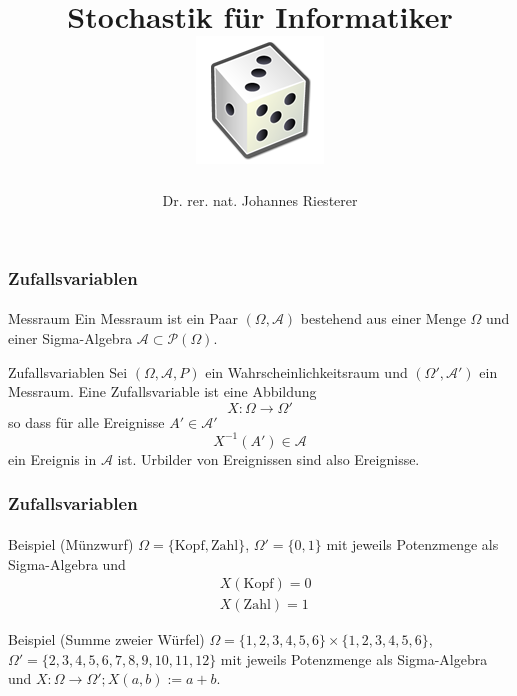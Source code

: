 \documentclass{beamer}
\begin{document}
\title[Stochastik] %
{Stochastik für Informatiker
\\
\includegraphics[scale=0.5]{img/craps}
}
\subtitle{}
\author[Dr. Johannes Riesterer] %
{Dr.  rer. nat. Johannes Riesterer}

\date[KPT 2004] %
{}

\subject{Stochastik}


\frame{\titlepage}


\begin{frame}
    \frametitle{Zufallsvariablen}
\framesubtitle{}

\begin{block}{Messraum}
Ein Messraum ist ein Paar $(\Omega, \mathcal{A})$ bestehend aus einer Menge $\Omega$ und einer Sigma-Algebra $\mathcal{A} \subset \mathcal{P}(\Omega)$.
\end{block}

\begin{block}{Zufallsvariablen}
Sei $(\Omega, \mathcal{A}, P)$ ein Wahrscheinlichkeitsraum und $(\Omega', \mathcal{A}')$ ein Messraum. Eine Zufallsvariable ist eine Abbildung
$$X : \Omega \to \Omega'$$ 
so dass für alle Ereignisse $A' \in  \mathcal{A}'$
$$ X^{-1} (A') \in \mathcal{A}$$
 ein Ereignis in $\mathcal{A}$ ist. Urbilder von Ereignissen sind also Ereignisse.
\end{block}

 \end{frame}

\begin{frame}
    \frametitle{Zufallsvariablen}
\framesubtitle{}
\begin{block}{Beispiel (Münzwurf)}
$\Omega = \{\text{Kopf}, \text{Zahl} \} $, $\Omega' = \{ 0,1 \}$  mit jeweils Potenzmenge als Sigma-Algebra und 
\begin{align*}
& X (\text{Kopf} ) = 0 \\
& X (\text{Zahl} ) = 1 
\end{align*}
\end{block}

\begin{block}{Beispiel (Summe zweier Würfel)}
$\Omega = \{1,2,3,4,5,6 \} \times \{1,2,3,4,5,6 \} $, $\Omega' = \{ 2,3,4,5,6,7,8,9,10, 11, 12\}$   mit jeweils Potenzmenge als Sigma-Algebra und $X: \Omega \to \Omega'; X (a,b) := a +b$. 
\end{block}

 \end{frame}
\end{document}

